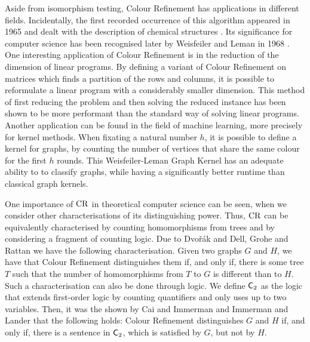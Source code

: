 Aside from isomorphism testing, Colour Refinement has applications in different fields.
Incidentally, the first recorded occurrence of this algorithm appeared in 1965 and dealt with the description of chemical structures \cite{morgan1965GenerationUnique}.
Its significance for computer science has been recognised later by Weisfeiler and Leman in 1968 \cite{weisfeiler1968reduction}.
One interesting application of Colour Refinement is in the reduction of the dimension of linear programs.
By defining a variant of Colour Refinement on matrices which finds a partition of the rows and columns, it is possible to reformulate a linear program with a considerably smaller dimension.
This method of first reducing the problem and then solving the reduced instance has been shown to be more performant than the standard way of solving linear programs. \cite{grohe2014DimensionReduction}
Another application can be found in the field of machine learning, more precisely for kernel methods.
When fixating a natural number $h$, it is possible to define a kernel for graphs, by counting the number of vertices that share the same colour for the first $h$ rounds.
This Weisfeiler-Leman Graph Kernel has an adequate ability to to classify graphs, while having a significantly better runtime than classical graph kernels. \cite{grohe2021ColorRefinement}

One importance of $\operatorname{CR}$ in theoretical computer science can be seen, when  we consider other characterisations of its distinguishing power.
Thus, $\operatorname{CR}$ can be equivalently characterised by counting homomorphisms from trees and by considering a fragment of counting logic.
Due to Dvo\v r\'ak \cite{dvorak2010RecognizingGraphsa} and Dell, Grohe and Rattan \cite{dell2018LovaszMeets} we have the following characterisation.
Given two graphs $G$ and $H$, we have that Colour Refinement distinguishes them if, and only if, there is some tree $T$ such that the number of homomorphisms from $T$ to $G$ is different than to $H$.
Such a characterisation can also be done through logic.
We define $\mathsf{C}_{2}$ as the logic that extends first-order logic by counting quantifiers and only uses up to two variables.
Then, it was the shown by Cai and Immerman \cite{cai1992OptimalLower} and Immerman and Lander \cite{immerman1990DescribingGraphs} that the following holds: 
Colour Refinement distinguishes $G$ and $H$ if, and only if, there is a sentence in $\mathsf{C}_{2}$, which is satisfied by $G$, but not by $H$.

